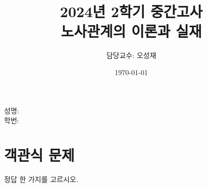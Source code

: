 \documentclass[11pt,answers]{exam} %
\begin{document}

    \title{\relax
        2024년 2학기 중간고사 \\
        \Large
        노사관계의 이론과 실재
    }
    \author{담당교수: 오성재}
    \date{\today}
    \maketitle

    \noindent
    성명: \makebox[.3\textwidth]{\hrulefill} \\[3pt]
    학번: \makebox[.3\textwidth]{\hrulefill}

    \addpoints\relax

\section*{객관식 문제}
정답 한 가지를 고르시오.
\end{document}
